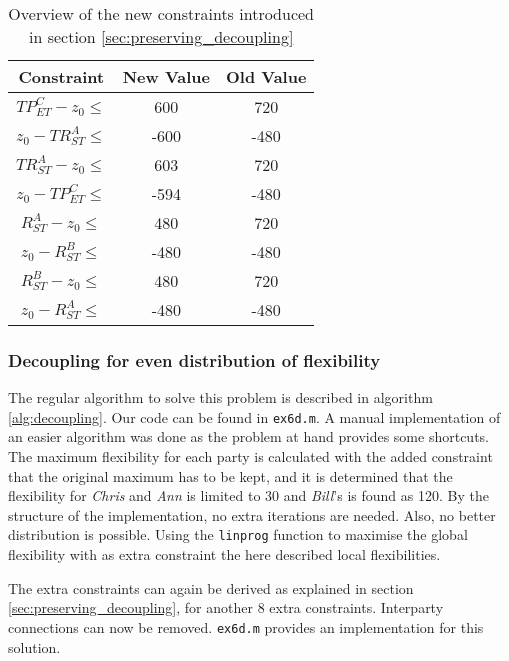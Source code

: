 \documentclass[10pt,a4paper]{article}
\begin{document}
\begin{table}
\centering
\begin{tabular}{ c | c | c }
Constraint & New Value & Old Value \\ \hline
$TP^C_{ET} - z_0 \leq $ & 600 & 720 \\
$z_0 - TR^A_{ST}\leq $ & -600 & -480 \\
$TR^A_{ST} - z_0\leq $ & 603 & 720 \\
$z_0 - TP^C_{ET}\leq $ & -594 & -480 \\
$R^A_{ST} - z_0 \leq $ & 480 & 720 \\
$z_0 - R^B_{ST} \leq $ & -480 & -480 \\
$R^B_{ST} - z_0\leq $ & 480 & 720 \\
$z_0 - R^A_{ST} \leq $ & -480 & -480
\end{tabular}
\caption{Overview of the new constraints introduced in section \ref{sec:preserving_decoupling}}
\label{table:constraints}
\end{table}

\subsubsection{Decoupling for even distribution of flexibility}
The regular algorithm to solve this problem is described in algorithm \ref{alg:decoupling}. Our code can be found in \texttt{ex6d.m}. A manual implementation of an easier algorithm was done as the problem at hand provides some shortcuts. The maximum flexibility for each party is calculated with the added constraint that the original maximum has to be kept, and it is determined that the flexibility for \emph{Chris} and \emph{Ann} is limited to 30 and \emph{Bill}'s is found as 120. By the structure of the implementation, no extra iterations are needed. Also, no better distribution is possible. Using the \texttt{linprog} function to maximise the global flexibility with as extra constraint the here described local flexibilities.

The extra constraints can again be derived as explained in section \ref{sec:preserving_decoupling}, for another 8 extra constraints. Interparty connections can now be removed. \texttt{ex6d.m} provides an implementation for this solution. \\
\end{document}
